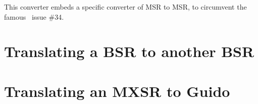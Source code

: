 This converter embeds a specific converter of MSR to MSR, to circumvent the famous \lily\ issue \#34.


\section{Translating a BSR to another BSR}


\section{Translating an MXSR to Guido}


